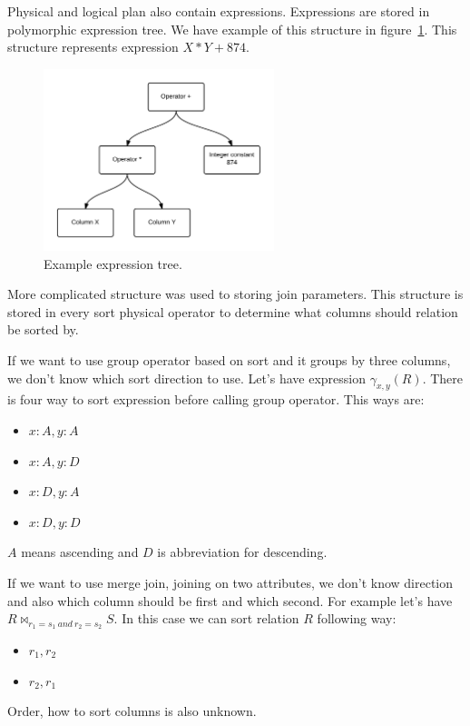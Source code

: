 Physical and logical plan also contain expressions. Expressions are stored in polymorphic expression tree. We have example of this structure in figure~\ref*{fig:expressiontree}. This structure represents expression $X*Y+874$.
\begin{figure}[h!]
  \centering
    \includegraphics[width=0.6\textwidth]{expressiontree}

      \caption{Example expression tree.}
          \label{fig:expressiontree}
\end{figure}

More complicated structure was used to storing join parameters. This structure is stored in every sort physical operator to determine what columns should relation be sorted by. 

If we want to use group operator based on sort and it groups by three columns, we don't know which sort direction to use. Let's have expression $\gamma_{x,y}(R)$. There is four way to sort expression before calling group operator. This ways are:
\begin{itemize}
\item $x:A,y:A$
\item $x:A,y:D$
\item $x:D,y:A$
\item $x:D,y:D$
\end{itemize}
$A$ means ascending and $D$ is abbreviation for descending.

If we want to use merge join, joining on two attributes, we don't know direction and also which column should be first and which second. For example let's have $R\Join_{r_1=s_1~and~r_2=s_2} S$. In this case we can sort relation $R$ following way:
\begin{itemize}
\item $r_1,r_2$
\item $r_2,r_1$
\end{itemize}
Order, how to sort columns is also unknown.

